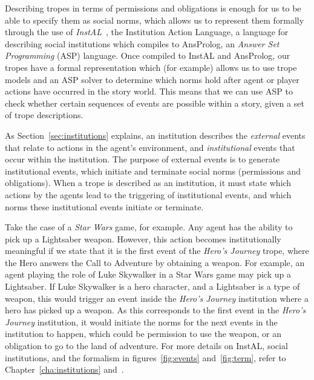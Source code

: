 \documentclass[11pt]{report}
\begin{document}
Describing tropes in terms of permissions and obligations is enough for us to be
able to specify them as social norms, which allows us to represent them
formally through the use of \emph{InstAL}~\citep{cliffe2007specifying}, the
Institution Action Language, a language for describing social institutions which compiles to AnsProlog, an \emph{Answer Set Programming} (ASP) language.
Once compiled to InstAL and AnsProlog, our tropes have a formal representation
which (for example) allows us to use trope models and an ASP solver to determine
which norms hold after agent or player actions have occurred in the story world.
This means that we can use ASP to check whether certain sequences of events are possible within a story,
given a set of trope descriptions.

As Section~\ref{sec:institutions} explains, an institution describes the
\emph{external} events that relate to actions in the agent's environment, and
\emph{institutional} events that occur within the institution. The purpose of
external events is to generate institutional events, which initiate and
terminate social norms (permissions and obligations). When a trope is described
as an institution, it must state which actions by the agents lead
to the triggering of institutional events, and which norms these institutional
events initiate or terminate.

Take the case of a \emph{Star Wars} game, for example. Any agent has the ability
to pick up a Lightsaber weapon. However, this action becomes institutionally
meaningful if we state that it is the first event of the \emph{Hero's Journey}
trope, where the Hero answers the Call to Adventure by obtaining a weapon.
For example, an agent playing the role of Luke Skywalker in a Star Wars game may
pick up a Lightsaber. If Luke Skywalker is a hero character, and a Lightsaber is
a type of weapon, this would trigger an event inside the \emph{Hero's Journey}
institution where a hero has
picked up a weapon. As this corresponds to the first event in the \emph{Hero's
  Journey} institution, it would initiate the norms for the next events in
the institution to happen, which could be permission to use the weapon, or an obligation to go to the land of adventure.
For more details on InstAL, social institutions, and the formalism in
figures~\ref{fig:events} and~\ref{fig:term}, refer to
Chapter~\ref{cha:institutions} and~\citep{cliffe2007specifying}.
\end{document}
